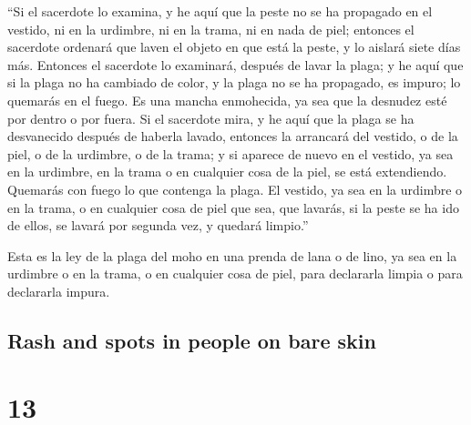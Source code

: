 \begin{paracol}{2}
 ``Si el sacerdote lo examina, y he aquí que la peste no
se ha propagado en el vestido, ni en la urdimbre, ni en la trama, ni en
nada de piel;  entonces el sacerdote ordenará que laven
el objeto en que está la peste, y lo aislará siete días más.
 Entonces el sacerdote lo examinará, después de lavar la
plaga; y he aquí que si la plaga no ha cambiado de color, y la plaga no
se ha propagado, es impuro; lo quemarás en el fuego. Es una mancha
enmohecida, ya sea que la desnudez esté por dentro o por fuera.
 Si el sacerdote mira, y he aquí que la plaga se ha
desvanecido después de haberla lavado, entonces la arrancará del
vestido, o de la piel, o de la urdimbre, o de la trama; 
y si aparece de nuevo en el vestido, ya sea en la urdimbre, en la trama
o en cualquier cosa de la piel, se está extendiendo. Quemarás con fuego
lo que contenga la plaga.  El vestido, ya sea en la
urdimbre o en la trama, o en cualquier cosa de piel que sea, que
lavarás, si la peste se ha ido de ellos, se lavará por segunda vez, y
quedará limpio.''

 Esta es la ley de la plaga del moho en una prenda de
lana o de lino, ya sea en la urdimbre o en la trama, o en cualquier cosa
de piel, para declararla limpia o para declararla impura.

\switchcolumn
\begin{otherlanguage}{english}

\hypertarget{rash-and-spots-in-people-on-bare-skin}{%
\subsection{Rash and spots in people on bare
skin}\label{rash-and-spots-in-people-on-bare-skin}}

\hypertarget{section-25}{%
\section{13}\label{section-25}}


\end{otherlanguage}
\end{paracol}
